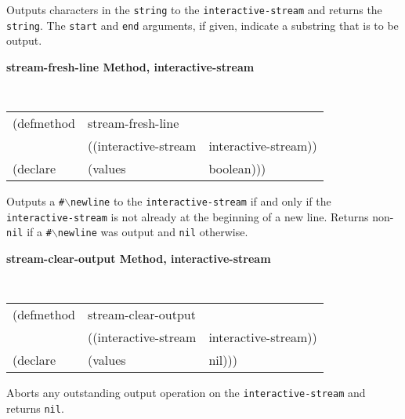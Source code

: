 \begin{flushright} \parbox[t]{6.125in}{
Outputs characters in the {\tt string} to the {\tt interactive-stream} and returns
the {\tt string}. The {\tt start} and {\tt end} arguments, if given, indicate a
substring that is to be output.
 
}
\end{flushright}

{\samepage
{\large {\bf stream-fresh-line \hfill Method, interactive-stream}}
\begin{flushright} \parbox[t]{6.125in}{
\tt
\begin{tabular}{lll}
\raggedright
(defmethod & stream-fresh-line & \\
& ((interactive-stream  &interactive-stream))\\
(declare &(values &boolean)))
\end{tabular}
\rm

}\end{flushright}}

\begin{flushright} \parbox[t]{6.125in}{
Outputs a {\tt \#$\backslash$newline} to the {\tt interactive-stream} if and only if
the {\tt interactive-stream} is not already at the beginning of a new line. Returns non-{\tt
nil} if a {\tt \#$\backslash$newline} was output and {\tt nil} otherwise.
 
}
\end{flushright}

{\samepage
{\large {\bf stream-clear-output \hfill Method, interactive-stream}}
\begin{flushright} \parbox[t]{6.125in}{
\tt
\begin{tabular}{lll}
\raggedright
(defmethod & stream-clear-output & \\
& ((interactive-stream  &interactive-stream))\\
(declare &(values &nil)))
\end{tabular}
\rm

}\end{flushright}}

\begin{flushright} \parbox[t]{6.125in}{
Aborts any outstanding output operation on the {\tt interactive-stream} and returns
{\tt nil}.
 
}
\end{flushright}

